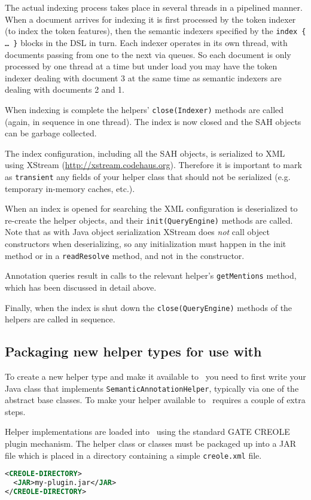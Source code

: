 The actual indexing process takes place in several threads in a pipelined
manner.  When a document arrives for indexing it is first processed by the
token indexer (to index the token features), then the semantic indexers
specified by the {\tt index \{ \ldots\ \}} blocks in the DSL in turn.  Each
indexer operates in its own thread, with documents passing from one to the next
via queues.  So each document is only processed by one thread at a time but
under load you may have the token indexer dealing with document 3 at the same
time as semantic indexers are dealing with documents 2 and 1.

When indexing is complete the helpers' {\tt close(Indexer)} methods are called
(again, in sequence in one thread).  The index is now closed and the SAH
objects can be garbage collected.

The index configuration, including all the SAH objects, is serialized to XML
using XStream (\url{http://xstream.codehaus.org}). Therefore it is important to
mark as \lstinline!transient! any fields of your helper class that should not be
serialized (e.g. temporary in-memory caches, etc.).

When an index is opened for searching the XML configuration is deserialized to
re-create the helper objects, and their {\tt init(QueryEngine)} methods are
called.  Note that as with Java object serialization XStream does {\em not}
call object constructors when deserializing, so any initialization must happen
in the init method or in a {\tt readResolve} method, and not in the
constructor.

Annotation queries result in calls to the relevant helper's {\tt getMentions}
method, which has been discussed in detail above.

Finally, when the index is shut down the {\tt close(QueryEngine)} methods of
the helpers are called in sequence.

\subsection{Packaging new helper types for use with \Mimir}

To create a new helper type and make it available to \Mimir\ you need to first
write your Java class that implements {\tt SemanticAnnotationHelper}, typically
via one of the abstract base classes.  To make your helper available to \Mimir\
requires a couple of extra steps.

Helper implementations are loaded into \Mimir\ using the standard GATE CREOLE
plugin mechanism.  The helper class or classes must be packaged up into a JAR
file which is placed in a directory containing a simple {\tt creole.xml} file.
\begin{lstlisting}[language=XML]
<CREOLE-DIRECTORY>
  <JAR>my-plugin.jar</JAR>
</CREOLE-DIRECTORY>
\end{lstlisting}

